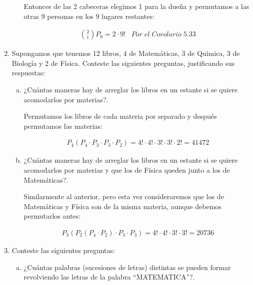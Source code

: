 \documentclass[letterpaper,11pt]{article}
\begin{document}
\begin{enumerate}
\begin{enumerate}[(a)]
        Entonces de las 2 cabeceras elegimos 1 para la dueña y permutamos a las otras 9 personas en los 9 lugares restantes:

        \begin{align*}
          \binom{2}{1} P_9 = 2 \cdot 9! \;\;\; Por \; el \; Corolario \; 5.33
        \end{align*}

      \end{enumerate}

    \item Supongamos que tenemos 12 libros, 4 de Matemáticas, 3 de Química, 3 de Biología y 2 de Física. Conteste las siguientes preguntas, justificando sus respuestas:
      \begin{enumerate}[(a)]
        \item ¿Cuántas maneras hay de arreglar los libros en un estante si se quiere acomodarlos por materias?.

        Permutamos los libros de cada materia por separado y después permutamos las materias:

        \begin{align*}
          P_4 (P_4 \cdot P_3 \cdot P_3 \cdot P_2) = 4! \cdot 4! \cdot 3! \cdot 3! \cdot 2! = 41472
        \end{align*}

        \item ¿Cuántas maneras hay de arreglar los libros en un estante si se quiere acomodarlos por materias y que los de Física queden junto a los de Matemáticas?.

        Similarmente al anterior, pero esta vez consideraremos que los de Matemáticas y Física son de la misma materia, aunque debemos permutarlos antes:

        \begin{align*}
          P_3 ( P_2 (P_4 \cdot P_2) \cdot P_3 \cdot P_3) = 4! \cdot 4! \cdot 3! \cdot 3! = 20736
        \end{align*}

      \end{enumerate}

    \item Conteste las siguientes preguntas:
      \begin{enumerate}[(a)]
        \item ¿Cuántas palabras (sucesiones de letras) distintas se pueden formar revolviendo las letras de la palabra “MATEMATICA”?. \newline


\end{enumerate}
\end{enumerate}
\end{document}
